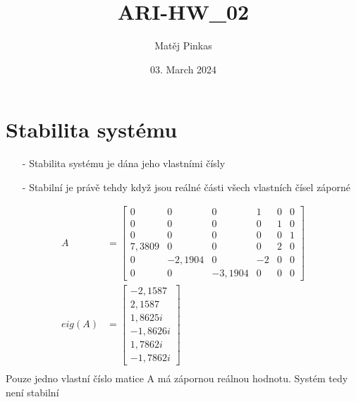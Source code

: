 \documentclass{article}
\title{ARI-HW\_02}
\author{Matěj Pinkas}
\date{03. March 2024}
\newcommand\mat[1]{\begin{bmatrix}#1\end{bmatrix}}
\begin{document}
\maketitle


\section{Stabilita systému}
\begin{itemize}
    \item [-] Stabilita systému je dána jeho vlastními čísly
    \item [-] Stabilní je právě tehdy když jsou reálné části všech vlastních čísel záporné
\end{itemize}

\begin{align*}
    A &= \mat{0 & 0 & 0 & 1 & 0 & 0\\
         0 & 0 & 0 & 0 & 1 & 0\\
         0 & 0 & 0 & 0 & 0 & 1\\
         7,3809 & 0 & 0 & 0 & 2 & 0\\
         0 & -2,1904 & 0 & -2 & 0 & 0\\
         0 & 0 & -3,1904 & 0 & 0 & 0}\\
    eig(A) &= \mat{-2,1587\\
                   2,1587\\
                   1,8625i\\
                   -1,8626i\\
                   1,7862i\\
                   -1,7862i}\\
\end{align*}
Pouze jedno vlastní číslo matice A má zápornou reálnou hodnotu. Systém tedy není stabilní\\

\end{document}
